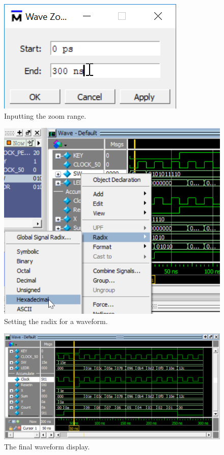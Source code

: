\documentclass[11pt, twoside, pdftex]{article}
\begin{document}
\begin{figure}[h!]
	\begin{center}
		\includegraphics[scale=0.8]{figures/appa_fig11.png}
	\end{center}
		  \caption{Inputting the zoom range.}
	\label{fig:appa_fig11}
\end{figure}

\begin{figure}[h!]
	\begin{center}
		\includegraphics[scale=0.8]{figures/appa_fig12.png}
	\end{center}
		  \caption{Setting the radix for a waveform.}
	\label{fig:appa_fig12}
\end{figure}

\begin{figure}[h!]
	\begin{center}
		\includegraphics[scale=0.8]{figures/appa_fig13.png}
	\end{center}
		  \caption{The final waveform display.}
	\label{fig:appa_fig13}
\end{figure}
\end{document}
